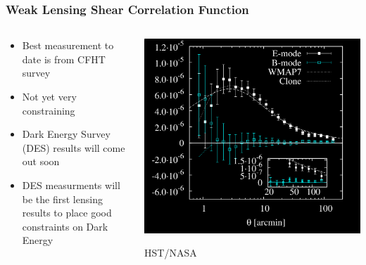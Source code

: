 \documentclass{beamer}
\begin{document}
\frame
{

    \frametitle{Weak Lensing Shear Correlation Function}


    \begin{columns}
        \begin{column}{0.5\textwidth}
            \begin{itemize}

                \item Best measurement to date is from CFHT survey

                \item Not yet very constraining

                \item Dark Energy Survey (DES) results will come out soon
                    
                \item DES measurments will be the first lensing results to place good
                    constraints on Dark Energy


            \end{itemize}

        \end{column}
        \begin{column}{0.5\textwidth}
            \begin{center}
                \includegraphics[width=\textwidth]{map-inv.png}
            \end{center}
            {\tiny HST/NASA}
        \end{column}

    \end{columns}


}
\end{document}
